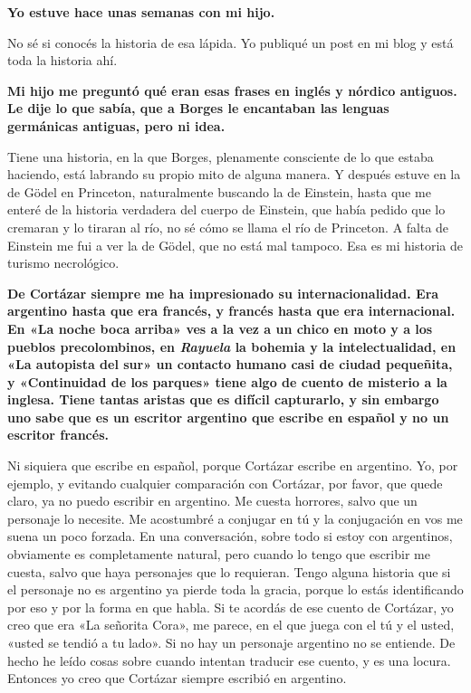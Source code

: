 \documentclass[11pt,a4paper]{article}
\newcommand{\preg}[1]{\textbf{#1}}
\begin{document}
\preg{Yo estuve hace unas semanas con mi hijo.}

No sé si conocés la historia de esa lápida. Yo publiqué un post en mi blog y está toda la historia ahí.

\preg{Mi hijo me preguntó qué eran esas frases en inglés y nórdico antiguos. Le dije lo que sabía, que a Borges le encantaban las lenguas germánicas antiguas, pero ni idea.}

Tiene una historia, en la que Borges, plenamente consciente de lo que estaba haciendo, está labrando su propio mito de alguna manera. Y después estuve en la de Gödel en Princeton, naturalmente buscando la de Einstein, hasta que me enteré de la historia verdadera del cuerpo de Einstein, que había pedido que lo cremaran y lo tiraran al río, no sé cómo se llama el río de Princeton. A falta de Einstein me fui a ver la de Gödel, que no está mal tampoco. Esa es mi historia de turismo necrológico.

\preg{De Cortázar siempre me ha impresionado su internacionalidad. Era argentino hasta que era francés, y francés hasta que era internacional. En «La noche boca arriba» ves a la vez a un chico en moto y a los pueblos precolombinos, en \emph{Rayuela} la bohemia y la intelectualidad, en «La autopista del sur» un contacto humano casi de ciudad pequeñita, y «Continuidad de los parques» tiene algo de cuento de misterio a la inglesa. Tiene tantas aristas que es difícil capturarlo, y sin embargo uno sabe que es un escritor argentino que escribe en español y no un escritor francés.}

Ni siquiera que escribe en español, porque Cortázar escribe en argentino. Yo, por ejemplo, y evitando cualquier comparación con Cortázar, por favor, que quede claro, ya no puedo escribir en argentino. Me cuesta horrores, salvo que un personaje lo necesite. Me acostumbré a conjugar en tú y la conjugación en vos me suena un poco forzada. En una conversación, sobre todo si estoy con argentinos, obviamente es completamente natural, pero cuando lo tengo que escribir me cuesta, salvo que haya personajes que lo requieran. Tengo alguna historia que si el personaje no es argentino ya pierde toda la gracia, porque lo estás identificando por eso y por la forma en que habla. Si te acordás de ese cuento de Cortázar, yo creo que era «La señorita Cora», me parece, en el que juega con el tú y el usted, «usted se tendió a tu lado». Si no hay un personaje argentino no se entiende. De hecho he leído cosas sobre cuando intentan traducir ese cuento, y es una locura. Entonces yo creo que Cortázar siempre escribió en argentino.
\end{document}

